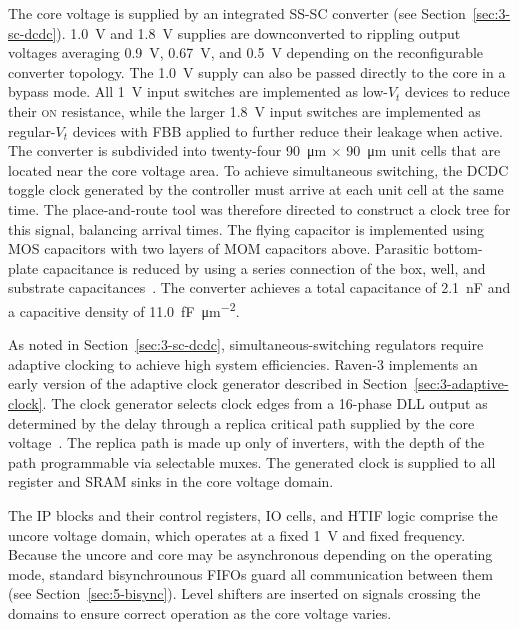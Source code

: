 \documentclass[graybox]{svmult}
\begin{document}
The core voltage is supplied by an integrated SS-SC converter (see Section~\ref{sec:3-sc-dcdc}).
\SI{1.0}{\volt} and \SI{1.8}{\volt} supplies are downconverted to rippling output voltages averaging \SI{0.9}{\volt}, \SI{0.67}{\volt}, and \SI{0.5}{\volt} depending on the reconfigurable converter topology.
The \SI{1.0}{\volt} supply can also be passed directly to the core in a bypass mode.
All \SI{1}{\volt} input switches are implemented as low-$V_t$ devices to reduce their \textsc{on} resistance, while the larger \SI{1.8}{\volt} input switches are implemented as regular-$V_t$ devices with FBB applied to further reduce their leakage when active.
The converter is subdivided into twenty-four \SI{90}{\micro\meter} $\times$ \SI{90}{\micro\meter} unit cells that are located near the core voltage area.
To achieve simultaneous switching, the DCDC toggle clock generated by the controller must arrive at each unit cell at the same time.
The place-and-route tool was therefore directed to construct a clock tree for this signal, balancing arrival times.
The flying capacitor is implemented using MOS capacitors with two layers of MOM capacitors above.
Parasitic bottom-plate capacitance is reduced by using a series connection of the box, well, and substrate capacitances~\cite{Le2013}.
The converter achieves a total capacitance of \SI{2.1}{\nano\farad} and a capacitive density of \SI{11.0}{\femto\farad\per\micro\meter\squared}. 

As noted in Section~\ref{sec:3-sc-dcdc}, simultaneous-switching regulators require adaptive clocking to achieve high system efficiencies.
Raven-3 implements an early version of the adaptive clock generator described in Section~\ref{sec:3-adaptive-clock}.
The clock generator selects clock edges from a 16-phase DLL output as determined by the delay through a replica critical path supplied by the core voltage~\cite{Kwak2016}.
The replica path is made up only of inverters, with the depth of the path programmable via selectable muxes.
The generated clock is supplied to all register and SRAM sinks in the core voltage domain.

The IP blocks and their control registers, IO cells, and HTIF logic comprise the uncore voltage domain, which operates at a fixed \SI{1}{\volt} and fixed frequency.
Because the uncore and core may be asynchronous depending on the operating mode, standard bisynchrounous FIFOs guard all communication between them (see Section~\ref{sec:5-bisync}).
Level shifters are inserted on signals crossing the domains to ensure correct operation as the core voltage varies.
\end{document}

